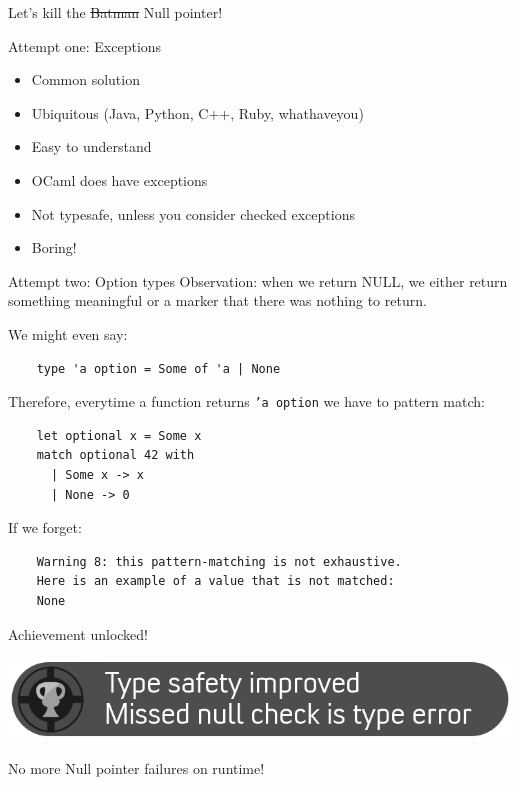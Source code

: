 \documentclass{beamer}
\begin{document}
\begin{frame}
  \begin{center}
    {\Huge Let's kill the \sout{Batman} Null pointer!}
  \end{center}
\end{frame}

\begin{frame}{Attempt one: Exceptions}
  \begin{itemize}
    \item Common solution
    \item Ubiquitous (Java, Python, C++, Ruby, whathaveyou)
    \item Easy to understand
    \item OCaml does have exceptions
    \pause
    \item \alert{Not typesafe}, unless you consider checked exceptions
    \item Boring!
  \end{itemize}
\end{frame}

\begin{frame}[fragile]{Attempt two: Option types}
  Observation: when we return NULL, we either return something
  meaningful or a marker that there was nothing to return.

  We might even say:
  \begin{verbatim}
    type 'a option = Some of 'a | None
  \end{verbatim}

  \pause

  Therefore, everytime a function returns \texttt{'a option} we have
  to pattern match:
  \begin{verbatim}
    let optional x = Some x
    match optional 42 with
      | Some x -> x
      | None -> 0
  \end{verbatim}

  \pause

  If we forget:
  \begin{verbatim}
    Warning 8: this pattern-matching is not exhaustive.
    Here is an example of a value that is not matched:
    None
  \end{verbatim}
\end{frame}

\begin{frame}{Achievement unlocked!}
  \begin{center}
    \includegraphics[width=\textwidth]{achivement-null-pointer}
  \end{center}
  \checkmark No more Null pointer failures on runtime!
\end{frame}
\end{document}
